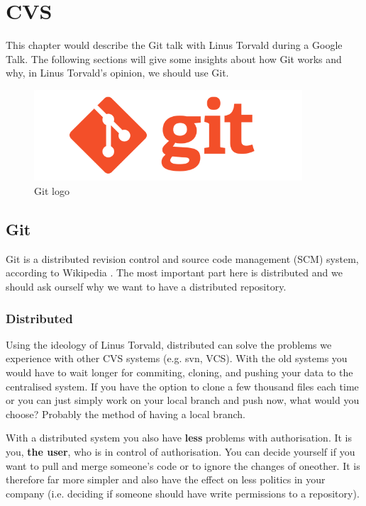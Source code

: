 \chapter{CVS}
\label{chap:cvs}
This chapter would describe the Git talk \cite{linus-git} with Linus Torvald during a Google Talk. The following sections will give some insights about how Git works and why, in Linus Torvald's opinion, we should use Git.

\begin{figure}[ht]
\begin{center}
\includegraphics[width=10cm]{Chapters/06_git_logo.png}
\end{center}
\caption{Git logo\footnotemark}
\label{img:git-logo}
\end{figure}


\section{Git}
\label{sec:git}
Git is a distributed revision control and source code management (SCM) system, according to Wikipedia \cite{git-wiki}. The most important part here is distributed and we should ask ourself why we want to have a distributed repository.

\subsection{Distributed}
\label{sec:git-distributed}
Using the ideology of Linus Torvald, distributed can solve the problems we experience with other CVS systems (e.g. svn, VCS). With the old systems you would have to wait longer for commiting, cloning, and pushing your data to the centralised system. If you have the option to clone a few thousand files each time or you can just simply work on your local branch and  push now, what would you choose? Probably the method of having a local branch.

With a distributed system you also have \textbf{less} problems with authorisation. It is you, \textbf{the user}, who is in control of authorisation. You can decide yourself if you want to pull and merge someone's code or to ignore the changes of oneother. It is therefore far more simpler and also have the effect on less politics in your company (i.e. deciding if someone should have write permissions to a repository).

